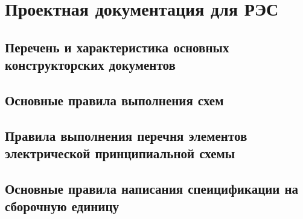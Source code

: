 
\section{Проектная документация для РЭС}

\subsection{Перечень и характеристика основных конструкторских документов}

\subsection{Основные правила выполнения схем}

\subsection{Правила выполнения перечня элементов электрической принципиальной схемы}

\subsection{Основные правила написания спеицификации на сборочную единицу}


\newpage
